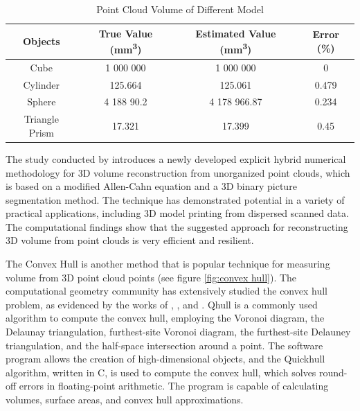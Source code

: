 \begin{table}[H]
	\caption{Point Cloud Volume of Different Model}
	\label{tab:Point Cloud Volume of Different Objects}
	\centering
	\begin{tabular}{|c|c|c|c|}
		\hline
		Objects        & True Value (\si{mm^3}) & Estimated Value (\si{mm^3}) & Error (\%) \\
		\hline
		Cube           & 1 000 000              & 1 000 000                   & 0          \\
		\hline
		Cylinder       & 125.664                & 125.061                     & 0.479      \\
		\hline
		Sphere         & 4 188 90.2             & 4 178 966.87                & 0.234      \\
		\hline
		Triangle Prism & 17.321                 & 17.399                      & 0.45       \\
		\hline
	\end{tabular}
\end{table}

The study conducted by \citet{jeong2018} introduces a newly developed explicit hybrid numerical methodology for 3D volume reconstruction from unorganized point clouds, which is based on a modified Allen-Cahn equation and a 3D binary picture segmentation method. The technique has demonstrated potential in a variety of practical applications, including 3D model printing from dispersed scanned data. The computational findings show that the suggested approach for reconstructing 3D volume from point clouds is very efficient and resilient.

The Convex Hull is another method that is popular technique for measuring volume from 3D point cloud points (see figure \ref{fig:convex hull}). The computational geometry community has extensively studied the convex hull problem, as evidenced by the works of \citet{kim2002}, \citet{graham1983}, and \citet{maus1984}. Qhull is a commonly used algorithm to compute the convex hull, employing the Voronoi diagram, the Delaunay triangulation, furthest-site Voronoi diagram, the furthest-site Delauney triangulation, and the half-space intersection around a point. The software program allows the creation of high-dimensional objects, and the Quickhull algorithm, written in C, is used to compute the convex hull, which solves round-off errors in floating-point arithmetic. The program is capable of calculating volumes, surface areas, and convex hull approximations.

